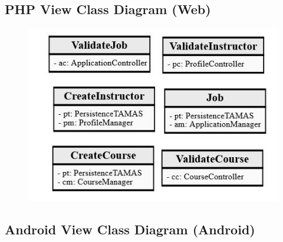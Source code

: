 \documentclass[12pt]{article}
\begin{document}
\subsection{PHP View Class Diagram (Web)}
\begin{figure}[H]
	\centering
	\includegraphics[]{./ClassDiagrams/WebViewPackageDiagram.jpg}
\end{figure}
\subsection{Android View Class Diagram (Android)}
\end{document}
